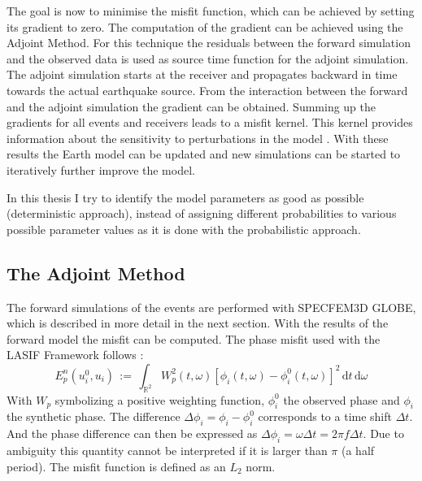 
The goal is now to minimise the misfit function, which can be achieved by setting its gradient to zero.
The computation of the gradient can be achieved using the Adjoint Method. 
For this technique the residuals between the forward simulation and the observed data is used as source time function %
for the adjoint simulation. 
The adjoint simulation starts at the receiver and propagates backward in time towards the actual earthquake source.
From the interaction between the forward and the adjoint simulation the gradient can be obtained. 
Summing up the gradients for all events and receivers leads to a misfit kernel. 
This kernel provides information about the sensitivity to perturbations in the model \citep{Magnoni2012}.
With these results the Earth model can be updated and new simulations can be started to iteratively further improve the model.

In this thesis I try to identify the model parameters as good as possible (deterministic approach), instead of assigning
different probabilities to various possible parameter values as it is done with the probabilistic approach.

\subsection{The Adjoint Method}


The forward simulations of the events are performed with SPECFEM3D GLOBE, which is described in more detail in the next section.
%
With the results of the forward model the misfit can be computed.
The phase misfit used with the LASIF Framework follows \citealp{Fichtner2009}:
%
\begin{equation} 
E_p^n(u_i^0, u_i) \, := \, \int_{\mathbb{R}^2} W_p^2(t,\omega) [\phi_i(t,\omega) - \phi_i^0(t,\omega)]^2 
   \, \mathrm{d}t \, \mathrm{d}\omega
\end{equation}
%
With $W_p$ symbolizing a positive weighting function, $\phi_i^0$ the observed phase and $\phi_i$ the synthetic phase.
The difference $\Delta \phi_i = \phi_i - \phi_i^0$ corresponds to a time shift $\Delta t$. 
And the phase difference can then be expressed as $\Delta \phi_i = \omega \Delta t = 2 \pi f \Delta t$.
Due to ambiguity this quantity cannot be interpreted if it is larger than $\pi$ (a half period).
The misfit function is defined as an $L_2$ norm. %


